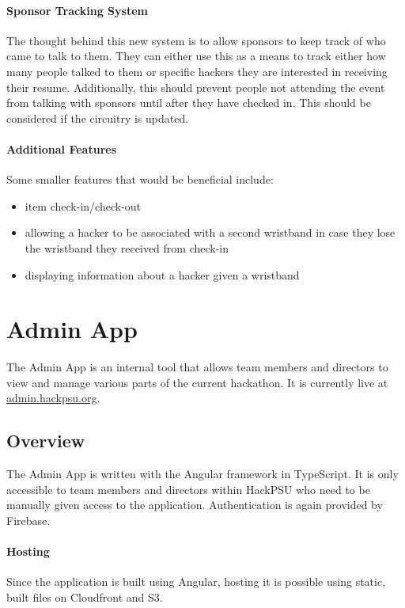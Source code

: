 \documentclass[twoside, 12pt]{article}
\newenvironment{tightitemize} %
{\begin{itemize}\itemsep1pt \parskip0pt \parsep0pt}
{\end{itemize}\vspace{-\topsep}}
\begin{document}
\paragraph{Sponsor Tracking System}
\par The thought behind this new system is to allow sponsors to keep track of who came to talk to them.  They can either use this as a means to track either how many people talked to them or specific hackers they are interested in receiving their resume.  Additionally, this should prevent people not attending the event from talking with sponsors until after they have checked in.  This should be considered if the circuitry is updated.
\paragraph{Additional Features}
\par Some smaller features that would be beneficial include:
\begin{tightitemize}
    \item item check-in/check-out
    \item allowing a hacker to be associated with a second wristband in case they lose the wristband they received from check-in
    \item displaying information about a hacker given a wristband
\end{tightitemize}


\newpage
\section{Admin App} \label{section:admin}
\par The Admin App is an internal tool that allows team members and directors to view and manage various parts of the current hackathon. It is currently live at \href{https://admin.hackpsu.org}{admin.hackpsu.org}.
\subsection{Overview}
\par The Admin App is written with the Angular framework in TypeScript. It is only accessible to team members and directors within HackPSU who need to be manually given access to the application. Authentication is again provided by Firebase.
\paragraph{Hosting}
\par Since the application is built using Angular, hosting it is possible using static, built files on Cloudfront and S3.
\end{document}
